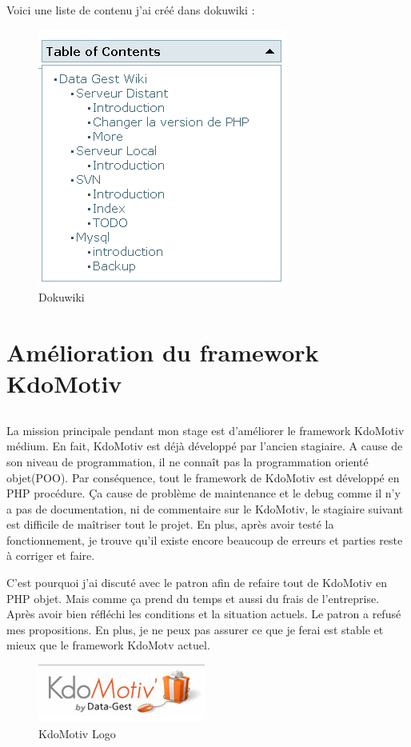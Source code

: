 Voici une liste de contenu j'ai créé dans dokuwiki :
\begin{figure}[hbtp]
\centering
\includegraphics[scale=1]{body/images/dokuwiki-content.png}
\caption{Dokuwiki}
\end{figure}


\newpage
\section[Amélioration KdoMotiv]{Amélioration du framework KdoMotiv}
\subsection*{}
La mission principale pendant mon stage est d'améliorer le framework KdoMotiv médium. En fait, KdoMotiv est déjà développé par l'ancien stagiaire. A cause de son niveau de programmation, il ne connaît pas la programmation orienté objet(POO). Par conséquence, tout le framework de KdoMotiv est développé en PHP procédure. Ça cause de problème de maintenance et le debug comme il n'y a pas de documentation, ni de commentaire sur le KdoMotiv, le stagiaire suivant est difficile de maîtriser tout le projet. En plus, après avoir testé la fonctionnement, je trouve qu'il existe encore beaucoup de erreurs et  parties reste à corriger et faire.

C'est pourquoi j'ai discuté avec le patron afin de refaire tout de KdoMotiv en PHP objet. Mais comme ça prend du temps et aussi du frais de l'entreprise. Après avoir bien réfléchi les conditions et la situation actuels. Le patron a refusé mes propositions. En plus, je ne peux pas assurer ce que je ferai est stable et mieux que le framework KdoMotv actuel. 

\begin{figure}[hbtp]
\centering
\includegraphics[scale=1]{body/images/kdomotiv.png}
\caption{KdoMotiv Logo}
\end{figure}



